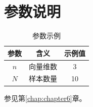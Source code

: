 \chapter{参数说明}
\label{app:parameters}

\begin{table}[htbp]
  \centering
  \caption{参数示例}\label{tab:parameters}
  \begin{tabular}{ccc}
    \toprule
    参数 & 含义 & 示例值 \\
    \midrule
    \(n\) & 向量维数 & 3 \\
    \(N\) & 样本数量 & 10 \\
    \bottomrule
  \end{tabular}
\end{table}

参见第\ref{chap:chapter6}章。

